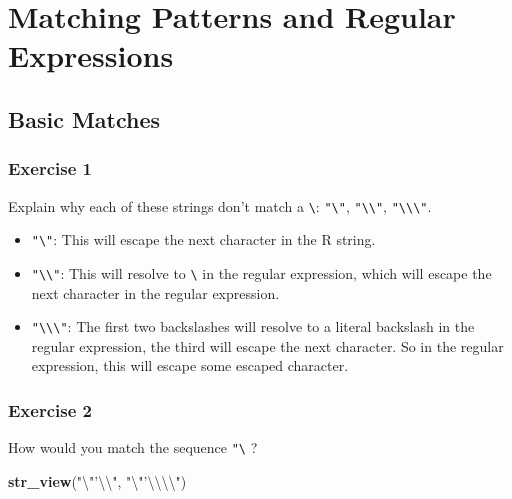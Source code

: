 \documentclass[]{book}
\newenvironment{Shaded}{\begin{snugshade}}{\end{snugshade}}
\newcommand{\CharTok}[1]{\textcolor[rgb]{0.31,0.60,0.02}{#1}}
\newcommand{\KeywordTok}[1]{\textcolor[rgb]{0.13,0.29,0.53}{\textbf{#1}}}
\newcommand{\NormalTok}[1]{#1}
\newcommand{\StringTok}[1]{\textcolor[rgb]{0.31,0.60,0.02}{#1}}
\providecommand{\tightlist}{%
  \setlength{\itemsep}{0pt}\setlength{\parskip}{0pt}}
\theoremstyle{plain}
\theoremstyle{remark}
\theoremstyle{definition}
\theoremstyle{definition}
\theoremstyle{definition}
\theoremstyle{remark}
\begin{document}
\hypertarget{matching-patterns-and-regular-expressions}{%
\section{Matching Patterns and Regular
Expressions}\label{matching-patterns-and-regular-expressions}}

\hypertarget{basic-matches}{%
\subsection{Basic Matches}\label{basic-matches}}

\hypertarget{exercise-1-31}{%
\subsubsection{Exercise 1}\label{exercise-1-31}}

Explain why each of these strings don't match a
\texttt{\textbackslash{}}: \texttt{"\textbackslash{}"},
\texttt{"\textbackslash{}\textbackslash{}"},
\texttt{"\textbackslash{}\textbackslash{}\textbackslash{}"}.

\begin{itemize}
\tightlist
\item
  \texttt{"\textbackslash{}"}: This will escape the next character in
  the R string.
\item
  \texttt{"\textbackslash{}\textbackslash{}"}: This will resolve to
  \texttt{\textbackslash{}} in the regular expression, which will escape
  the next character in the regular expression.
\item
  \texttt{"\textbackslash{}\textbackslash{}\textbackslash{}"}: The first
  two backslashes will resolve to a literal backslash in the regular
  expression, the third will escape the next character. So in the
  regular expression, this will escape some escaped character.
\end{itemize}

\hypertarget{exercise-2-30}{%
\subsubsection{Exercise 2}\label{exercise-2-30}}

How would you match the sequence
\texttt{"\textquotesingle{}\textbackslash{}} ?

\begin{Shaded}
\begin{Highlighting}[]
\KeywordTok{str_view}\NormalTok{(}\StringTok{"}\CharTok{\textbackslash{}"}\StringTok{'}\CharTok{\textbackslash{}\textbackslash{}}\StringTok{"}\NormalTok{, }\StringTok{"}\CharTok{\textbackslash{}"}\StringTok{'}\CharTok{\textbackslash{}\textbackslash{}\textbackslash{}\textbackslash{}}\StringTok{"}\NormalTok{)}
\end{Highlighting}
\end{Shaded}
\end{document}
